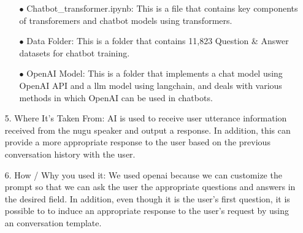 \documentclass[conference]{IEEEtran}
\begin{document}
\begin{itemize}
\begin{itemize}
        \item[$\bullet$]Chatbot\_transformer.ipynb: This is a file that contains key components of transforemers and chatbot models using transformers.
        \item[$\bullet$]Data Folder: This is a folder that contains 11,823 Question \& Answer datasets for chatbot training.
        \item[$\bullet$]OpenAI Model: This is a folder that implements a chat model using OpenAI API and a llm model using langchain, and deals with various methods in which OpenAI can be used in chatbots.

    \end{itemize}

    \item[5.] Where It's Taken From: AI is used to receive user utterance information received from the nugu speaker and output a response. In addition, this can provide a more appropriate response to the user based on the previous conversation history with the user.\\
    
    \item[6.] How / Why you used it: We used openai because we can customize the prompt so that we can ask the user the appropriate questions and answers in the desired field. In addition, even though it is the user's first question, it is possible to to induce an appropriate response to the user's request by using an conversation template.
\end{itemize}
\end{document}
